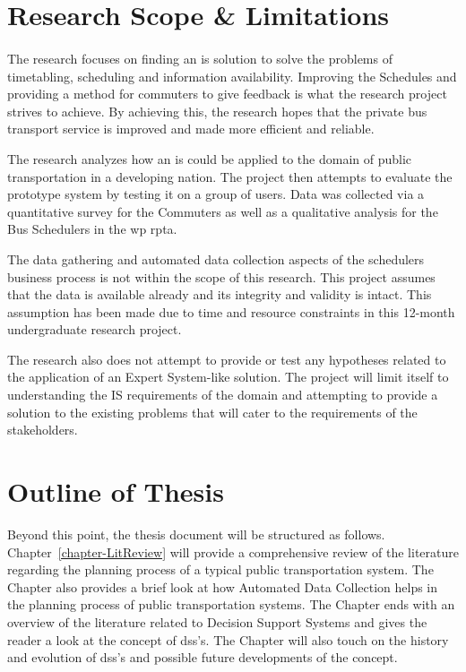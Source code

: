\section{Research Scope \& Limitations}
\label{section-ResearchScope}

\paragraph{ } The research focuses on finding an \acrshort{is} solution to solve the problems of timetabling, scheduling and information availability. Improving the Schedules and providing a method for commuters to give feedback is what the research project strives to achieve. By achieving this, the research hopes that the private bus transport service is improved and made more efficient and reliable.

The research analyzes how an \acrshort{is} could be applied to the domain of public transportation in a developing nation. The project then attempts to evaluate the prototype system by testing it on a group of users. Data was collected via a quantitative survey for the Commuters as well as a qualitative analysis for the Bus Schedulers in the \acrshort{wp} \acrshort{rpta}.

The data gathering and automated data collection aspects of the schedulers business process is not within the scope of this research. This project assumes that the data is available already and its integrity and validity is intact. This assumption has been made due to time and resource constraints in this 12-month undergraduate research project.

The research also does not attempt to provide or test any hypotheses related to the application of an Expert System-like solution. The project will limit itself to understanding the IS requirements of the domain and attempting to provide a solution to the existing problems that will cater to the requirements of the stakeholders.




\section{Outline of Thesis}
\label{section-OutlineOfThesis}

Beyond this point, the thesis document will be structured as follows. Chapter~\ref{chapter-LitReview} will provide a comprehensive review of the literature regarding the planning process of a typical public transportation system. The Chapter also provides a brief look at how Automated Data Collection helps in the planning process of public transportation systems. The Chapter ends with an overview of the literature related to Decision Support Systems and gives the reader a look at the concept of \acrshort{dss}'s. The Chapter will also touch on the history and evolution of \acrshort{dss}'s and possible future developments of the concept.

